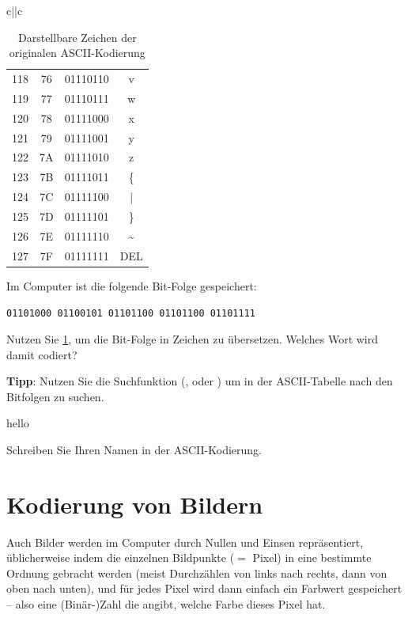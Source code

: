 \begin{table}[H]
{\begin{tabular}{c||c}
\begin{tabular}{cccc}
				118     & 76          & 01110110 & v               \\
				119     & 77          & 01110111 & w               \\
				120     & 78          & 01111000 & x               \\
				121     & 79          & 01111001 & y               \\
				122     & 7A          & 01111010 & z               \\
				123     & 7B          & 01111011 & \{              \\
				124     & 7C          & 01111100 & |               \\
				125     & 7D          & 01111101 & \}              \\
				126     & 7E          & 01111110 & \textasciitilde \\
				127     & 7F          & 01111111 & DEL             \\
				\bottomrule
			\end{tabular}
		\end{tabular}}
	\caption{Darstellbare Zeichen der originalen \gls{ASCII}-Kodierung}
	\label{table:ascii}
\end{table}
\clearpage

\begin{myexercise}
	Im Computer ist die folgende Bit-Folge gespeichert:

	\texttt{01101000 01100101 01101100 01101100 01101111}

	Nutzen Sie \cref{table:ascii}, um die Bit-Folge in Zeichen zu übersetzen. Welches Wort wird damit codiert?

	\textbf{Tipp}: Nutzen Sie die Suchfunktion (, oder ) um in der ASCII-Tabelle nach den Bitfolgen zu suchen.
	\begin{myanswer}
		hello
	\end{myanswer}
\end{myexercise}

\begin{myexercise}
	Schreiben Sie Ihren Namen in der \gls{ASCII}-Kodierung.
\end{myexercise}

\section{Kodierung von Bildern}

Auch Bilder werden im Computer durch Nullen und Einsen repräsentiert, üblicherweise indem die einzelnen Bildpunkte ($=$ Pixel) in eine bestimmte Ordnung gebracht werden (meist Durchzählen von links nach rechts, dann von oben nach unten), und für jedes Pixel wird dann einfach ein Farbwert gespeichert -- also eine (Binär-)Zahl die angibt, welche Farbe dieses Pixel hat.

